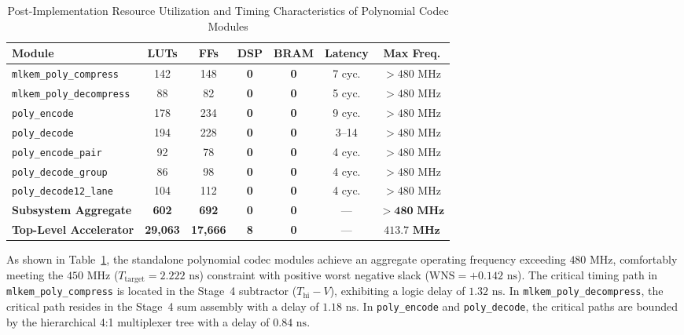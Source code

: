 \begin{table}[htbp]
\caption{Post-Implementation Resource Utilization and Timing Characteristics of Polynomial Codec Modules}
\label{tab:codec_resources}
\centering
\scriptsize
\setlength{\tabcolsep}{1.8pt}
\begin{tabular*}{\columnwidth}{@{\extracolsep{\fill}} lcccccc @{}}
\toprule
\textbf{Module} & \textbf{LUTs} & \textbf{FFs} & \textbf{DSP} & \textbf{BRAM} & \textbf{Latency} & \textbf{Max Freq.} \\
\midrule
\texttt{mlkem\_poly\_compress}   & 142 & 148 & \textbf{0} & \textbf{0} & 7 cyc. & $> 480\text{ MHz}$ \\
\texttt{mlkem\_poly\_decompress} & 88  & 82  & \textbf{0} & \textbf{0} & 5 cyc. & $> 480\text{ MHz}$ \\
\texttt{poly\_encode}           & 178 & 234 & \textbf{0} & \textbf{0} & 9 cyc. & $> 480\text{ MHz}$ \\
\texttt{poly\_decode}           & 194 & 228 & \textbf{0} & \textbf{0} & 3--14  & $> 480\text{ MHz}$ \\
\texttt{poly\_encode\_pair}      & 92  & 78  & \textbf{0} & \textbf{0} & 4 cyc. & $> 480\text{ MHz}$ \\
\texttt{poly\_decode\_group}     & 86  & 98  & \textbf{0} & \textbf{0} & 4 cyc. & $> 480\text{ MHz}$ \\
\texttt{poly\_decode12\_lane}    & 104 & 112 & \textbf{0} & \textbf{0} & 4 cyc. & $> 480\text{ MHz}$ \\
\midrule
\textbf{Subsystem Aggregate}     & \textbf{602} & \textbf{692} & \textbf{0} & \textbf{0} & ---  & $\mathbf{> 480\text{ MHz}}$ \\
\textbf{Top-Level Accelerator}   & \textbf{29,063} & \textbf{17,666} & \textbf{8} & \textbf{0} & ---  & $\mathbf{413.7\text{ MHz}}$ \\
\bottomrule
\end{tabular*}
\end{table}

As shown in Table~\ref{tab:codec_resources}, the standalone polynomial codec modules achieve an aggregate operating frequency exceeding $480\text{ MHz}$, comfortably meeting the $450\text{ MHz}$ ($T_{\text{target}} = 2.222\text{ ns}$) constraint with positive worst negative slack ($\text{WNS} = +0.142\text{ ns}$). The critical timing path in \texttt{mlkem\_poly\_compress} is located in the Stage~4 subtractor ($T_{\text{hi}} - V$), exhibiting a logic delay of $1.32\text{ ns}$. In \texttt{mlkem\_poly\_decompress}, the critical path resides in the Stage~4 sum assembly with a delay of $1.18\text{ ns}$. In \texttt{poly\_encode} and \texttt{poly\_decode}, the critical paths are bounded by the hierarchical 4:1 multiplexer tree with a delay of $0.84\text{ ns}$.

